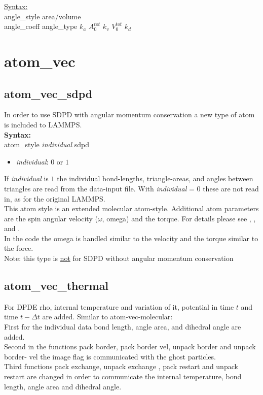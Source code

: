 \underline{Syntax:}\\
angle\_style \quad area/volume \\
angle\_coeff \quad angle\_type $k_a$  $A_0^{tot}$ $k_v$ $V_0^{tot}$ $k_d$


\section{atom\_vec}


\subsection{atom\_vec\_sdpd}

In order to use SDPD with angular momentum conservation a new type of atom is included to LAMMPS.
\\[2ex]
{\bfseries Syntax:}\\
atom\_style    \textit{individual} sdpd
\begin{itemize}
\item \textit{individual}: $0$ or $1$
\end{itemize}

If \textit{individual} is $1$ the individual bond-lengths, triangle-areas, and angles between triangles are read from the data-input file.
With \textit {individual} = $0$ these are not read in, as for the original LAMMPS.
\\[2ex]
This atom style is an extended molecular atom-style.
Additional atom parameters are the spin angular velocity ($\omega$, omega) and the torque.
For details please see , , and .
\\[2ex]
In the code the omega is handled similar to the velocity and the torque similar to the force.
\\[2ex]
Note: this type is \underline{not} for SDPD without angular momentum conservation

\subsection{atom\_vec\_thermal}
 For DPDE rho, internal temperature and variation of it, potential in time $t$ and time $t-\Delta t$  are added. Similar to atom-vec-molecular:\\
 First for the individual data bond length, angle area, and dihedral angle are added.\\
 Second in the functions pack border, pack border vel, unpack border and unpack border- vel the image flag is communicated with the ghost particles.\\
 Third functions pack exchange, unpack exchange , pack restart and unpack restart are changed in order to communicate the internal temperature, bond length, angle area and dihedral angle.
